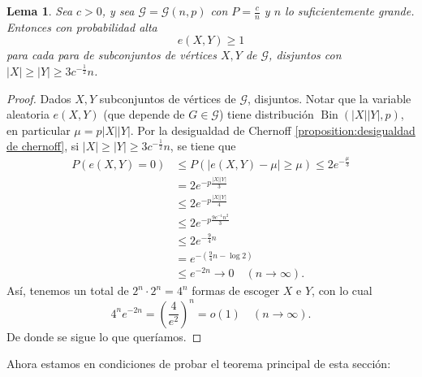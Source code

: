 \documentclass[12pt]{report}
\theoremstyle{plain}
\newtheorem{lemma}[theorem]{Lema}
\theoremstyle{definition}
\newcommand{\abs}[1]{\left \vert #1 \right \vert}
\begin{document}
\begin{lemma}
Sea $c > 0$, y sea $\mathcal G = \mathcal G (n,p)$ con $P = \frac c n$ y $n$ lo suficientemente grande. Entonces con probabilidad alta
\[
    e(X,Y) \geq 1
\]
para cada para de subconjuntos de vértices $X,Y$ de $\mathcal G$, disjuntos con $\abs X \geq \abs Y \geq 3 c^{-\frac 1 2} n$.
\end{lemma}
\begin{proof}
Dados $X,Y$ subconjuntos de vértices de $\mathcal G$, disjuntos. Notar que la variable aleatoria $e(X,Y)$ (que depende de $G \in \mathcal G$) tiene distribución $\operatorname{Bin}(\abs X \abs Y, p)$, en particular $\mu = p \abs X \abs Y$. Por la desigualdad de Chernoff \ref{proposition:desigualdad de chernoff}, si $\abs X \geq \abs Y \geq 3 c^{-\frac 1 2}n$, se tiene que
\begin{align*}
P(e(X,Y) = 0) &\leq P(\abs{e(X,Y) -  \mu} \geq \mu) \leq 2 e^{- \frac \mu 3} \\
&= 2 e^{-p \frac{\abs X \abs Y}{3}} \\
&\leq 2 e^{-p \frac{\abs X \abs Y}{4}} \\
&\leq 2 e^{-p \frac{9 c^{-1} n^2}{3}} \\
&\leq 2 e^{-\frac 9 4 n}\\
&= e^{- (\frac 9 4 n - \log 2)} \\
&\leq e^{-2n} \longrightarrow 0 \quad (n \to \infty).
\end{align*}
Así, tenemos un total de $2^n \cdot 2^n = 4^n$ formas de escoger $X$ e $Y$, con lo cual
\[
    4^n e^{-2n} = \left (\frac 4 {e^2} \right)^n = o(1) \quad (n \to \infty).
\]
De donde se sigue lo que queríamos.
\end{proof}


Ahora estamos en condiciones de probar el teorema principal de esta sección:
\end{document}
